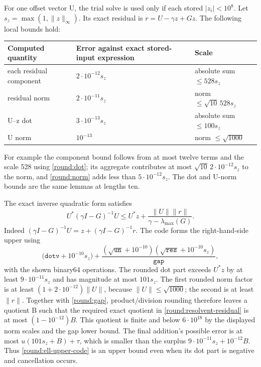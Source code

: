 For one offset vector U, the trial solve is used only if each stored
$|z_i|<10^8$.  Let $s_z=\max(1,\|z\|_\infty)$.
Its exact residual is $r=U-\gamma z+Gz$.  The following local bounds
hold:
\begin{center}
\small
\begin{tabular}{p{.25\linewidth}p{.36\linewidth}p{.29\linewidth}}
\hline
Computed quantity & Error against exact stored-input expression & Scale\\
\hline
each residual component & $2\cdot10^{-12}s_z$ & absolute sum $\le528s_z$\\
residual norm & $2\cdot10^{-11}s_z$ & norm $\le\sqrt{10}\,528s_z$\\
U--z dot & $3\cdot10^{-13}s_z$ & absolute sum $\le100s_z$\\
U norm & $10^{-13}$ & norm $\le\sqrt{1000}$\\
\hline
\end{tabular}
\end{center}
For example the component bound follows from at most twelve terms
and the scale 528 using \eqref{round:dot}; its aggregate contributes
at most $\sqrt{10}\,2\cdot10^{-12}s_z$ to the norm, and
\eqref{round:norm} adds less than $5\cdot10^{-12}s_z$.
The dot and U-norm bounds are the same lemmas at lengths ten.

The exact inverse quadratic form satisfies
\begin{equation}\label{round:resolvent-residual}
 U^*(\gamma I-G)^{-1}U
 \le U^*z+\frac{\|U\|\|r\|}{\gamma-\lambda_{\max}(G)}.
\end{equation}
Indeed $(\gamma I-G)^{-1}U=z+(\gamma I-G)^{-1}r$.
The code forms the right-hand-side upper using
\begin{equation}\label{round:ell-upper-code}
 \big(\mathtt{dotv}+10^{-10}s_z\big)
 +\frac{(\sqrt{\mathtt{un}}+10^{-10})
         (\sqrt{\mathtt{res}}+10^{-10}s_z)}{\mathtt{gap}},
\end{equation}
with the shown binary64 operations.
The rounded dot part exceeds $U^*z$ by at least
$9\cdot10^{-11}s_z$ and has magnitude at most $101s_z$.
The first rounded norm factor is at least
$(1+2\cdot10^{-12})\|U\|$, because $\|U\|\le\sqrt{1000}$;
the second is at least $\|r\|$.
Together with \eqref{round:gap}, product/division rounding therefore
leaves a quotient B such that the required exact quotient in
\eqref{round:resolvent-residual} is at most $(1-10^{-12})B$.
This quotient is finite and below $6\cdot10^{18}$ by the displayed
norm scales and the gap lower bound.  The final addition's possible
error is at most $u(101s_z+B)+\tau$, which is smaller than the
surplus $9\cdot10^{-11}s_z+10^{-12}B$.
Thus \eqref{round:ell-upper-code} is an upper bound even when its
dot part is negative and cancellation occurs.

